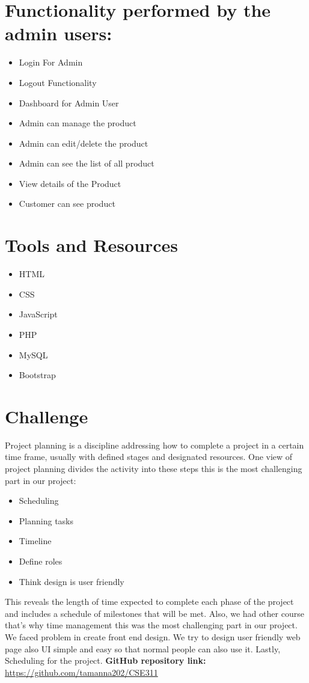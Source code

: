 \documentclass[12pt,letterpaper]{article}
\begin{document}
\hfill \break

\section{Functionality performed by the admin users:}
\begin{itemize}
    \item 	Login For Admin
    \item 	Logout Functionality
    \item	Dashboard for Admin User
    \item Admin can manage the product
    \item	Admin can edit/delete the product
    \item	Admin can see the list of all product
    \item	View details of the Product
    \item  	Customer can see product
\end{itemize}

\hfill \break

\section{Tools and Resources}
\begin{itemize}
    \item HTML
    \item CSS
    \item JavaScript
    \item PHP
    \item MySQL
    \item Bootstrap
\end{itemize}

\hfill \break

\section{Challenge}
     Project planning is a discipline addressing how to complete a project in a certain time frame, usually with defined stages and designated resources. One view of project planning divides the activity into these steps this is the most challenging part in our project: 
    \begin{itemize}
         \item	Scheduling
         \item Planning tasks
         \item Timeline
          \item Define roles
          \item Think design is user friendly
    \end{itemize}
     This reveals the length of time expected to complete each phase of the project and includes a schedule of milestones that will be met. Also, we had other course that’s why time management this was the most challenging part in our project. We faced problem in create front end design. We try to design user friendly web page also UI simple and easy so that normal people can also use it. Lastly, Scheduling for the project.
     \hfill \break
     \hfill \break
     {\bf GitHub repository link:}
     \url{https://github.com/tamanna202/CSE311}
\end{document}
